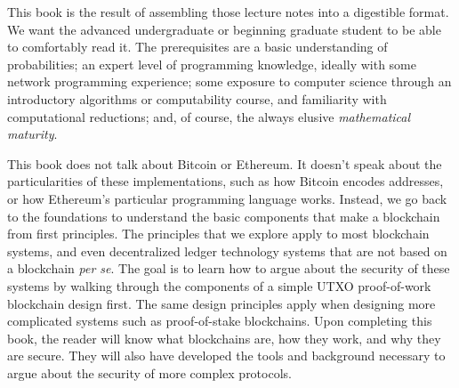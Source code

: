 This book is the result of assembling those lecture notes into a
digestible format. We want the advanced undergraduate or beginning
graduate student to be able to comfortably read it. The prerequisites
are a basic understanding of probabilities; an expert level of programming
knowledge, ideally with some network programming experience; some exposure
to computer science through an introductory algorithms or computability
course, and familiarity with computational reductions;
and, of course, the always elusive \emph{mathematical maturity}.

This book does not talk about Bitcoin or Ethereum. It doesn't speak
about the particularities of these implementations, such as how Bitcoin
encodes addresses, or how Ethereum's particular programming language works.
Instead, we go back to the foundations to understand the basic components
that make a blockchain from first principles. The principles that we explore
apply to most blockchain systems, and even decentralized ledger technology
systems that are not based on a blockchain \emph{per se}. The goal is to learn
how to argue about the security of these systems by walking through the
components of a simple UTXO proof-of-work blockchain design first. The
same design principles apply when designing more complicated systems such
as proof-of-stake blockchains. Upon completing this book, the reader will
know what blockchains are, how they work, and why they are secure. They
will also have developed the tools and background necessary to argue about
the security of more complex protocols.
